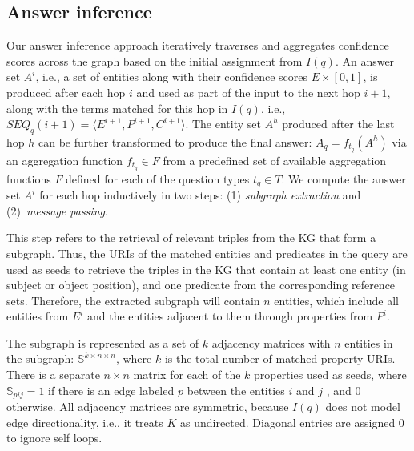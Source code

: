 \subsection{Answer inference}

Our answer inference approach %
iteratively traverses and aggregates confidence scores across the graph based on the initial assignment from $I(q)$.
An answer set $A^i$, i.e., a set of entities along with their confidence scores $E \times [0, 1]$, is produced after each hop $i$ and used as part of the input to the next hop $i+1$, along with the %
terms matched for this hop in $I(q)$, i.e., $SEQ_q(i+1) = \langle E^{i+1}, P^{i+1}, C^{i+1}\rangle$.
The entity set $A^h$ produced after the last hop $h$ can be further transformed to produce the final answer: $A_q=f_{t_q}(A^h)$ via an aggregation function $f_{t_q} \in F$ from a predefined set of available aggregation functions $F$ defined for each of the question types $t_q \in T$.
We compute the answer set $A^i$ for each hop inductively in two steps: (1) \emph{subgraph extraction} and (2)~\emph{message passing}.

This step refers to the retrieval of relevant triples from the KG that form a subgraph.
Thus, the URIs of the matched entities and predicates in the query are used as seeds to retrieve the triples in the KG that contain at least one entity (in subject or object position), and one predicate from the corresponding reference sets.
Therefore, the extracted subgraph will contain $n$ entities, which include all entities from $E^{i}$ and the entities adjacent to them through properties from $P^{i}$.

The subgraph is represented as a set of $k$ adjacency matrices with $n$ entities in the subgraph: $\mathbb{S}^{k\times n\times n}$, where $k$ is the total number of matched property URIs.
There is a separate $n\times n$ matrix for each of the $k$ properties used as seeds, where $\mathbb{S}_{pij} = 1$ if there is an edge labeled $p$ between the entities $i$ and $j$ , and 0 otherwise.
All adjacency matrices are symmetric, because $I(q)$ does not model edge directionality, i.e., it treats $K$ as undirected.
Diagonal entries are assigned 0 to ignore self loops.

